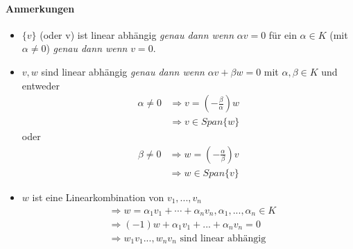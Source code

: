 \documentclass[11pt]{report}
\begin{document}
 \paragraph{Anmerkungen}
\begin{itemize}
 \item $\{v\}$ (oder v) ist linear abhängig \textit{genau dann wenn} $\alpha v = 0$ für ein $\alpha \in K$ (mit $\alpha \neq 0$) \textit{genau dann wenn} $v=0$.
 \item $v, w$ sind linear abhängig \textit{genau dann wenn} $\alpha v + \beta w = 0$ mit $\alpha, \beta \in K$ und entweder
\begin{align}
 \alpha \neq 0 &\Rightarrow v = (-\frac{\beta}{\alpha}) w \\
 &\Rightarrow v \in Span\{w\} 
\end{align}
oder
\begin{align}
 \beta \neq 0 &\Rightarrow w = (-\frac{\alpha}{\beta}) v \\
 &\Rightarrow w \in Span\{v\}  
\end{align}
\item $w$ ist eine Linearkombination von $v_1, ..., v_n$
\begin{align}
 &\Rightarrow w = \alpha_1 v_1 + \cdots + \alpha_n v_n, \alpha_1, ..., \alpha_n \in K \\
 &\Rightarrow (-1)w + \alpha_1 v_1 + ... + \alpha_n v_n = 0 \\
 &\Rightarrow w_1 v_1 ..., w_n v_n \text{ sind linear abhängig} 
\end{align}
\end{itemize}
\end{document}
